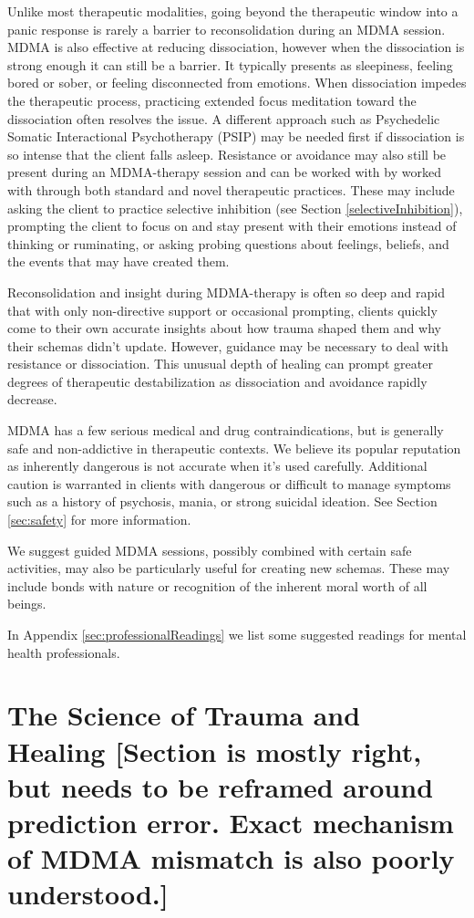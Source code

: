 \documentclass[12pt,letterpaper]{book}
\begin{document}
Unlike most therapeutic modalities, going beyond the therapeutic window into a panic response is rarely a barrier to reconsolidation during an MDMA session. MDMA is also effective at reducing dissociation, however when the dissociation is strong enough it can still be a barrier. It typically presents as sleepiness, feeling bored or sober, or feeling disconnected from emotions. When dissociation impedes the therapeutic process, practicing extended focus meditation toward the dissociation often resolves the issue. A different approach such as Psychedelic Somatic Interactional Psychotherapy (PSIP) may be needed first if dissociation is so intense that the client falls asleep. Resistance or avoidance may also still be present during an MDMA-therapy session and can be worked with by worked with through both standard and novel therapeutic practices. These may include asking the client to practice selective inhibition (see Section \ref{selectiveInhibition}), prompting the client to focus on and stay present with their emotions instead of thinking or ruminating, or asking probing questions about feelings, beliefs, and the events that may have created them.

Reconsolidation and insight during MDMA-therapy is often so deep and rapid that with only non-directive support or occasional prompting, clients quickly come to their own accurate insights about how trauma shaped them and why their schemas didn't update. However, guidance may be necessary to deal with resistance or dissociation. This unusual depth of healing can prompt greater degrees of therapeutic destabilization as dissociation and avoidance rapidly decrease.

MDMA has a few serious medical and drug contraindications, but is generally safe and non-addictive in therapeutic contexts. We believe its popular reputation as inherently dangerous is not accurate when it's used carefully. Additional caution is warranted in clients with dangerous or difficult to manage symptoms such as a history of psychosis, mania, or strong suicidal ideation. See Section \ref{sec:safety} for more information.

We suggest guided MDMA sessions, possibly combined with certain safe activities, may also be particularly useful for creating new schemas. These may include bonds with nature or recognition of the inherent moral worth of all beings.

In Appendix \ref{sec:professionalReadings} we list some suggested readings for mental health professionals.
\section{The Science of Trauma and Healing [Section is mostly right, but needs to be reframed around prediction error. Exact mechanism of MDMA mismatch is also poorly understood.]}
\end{document}
